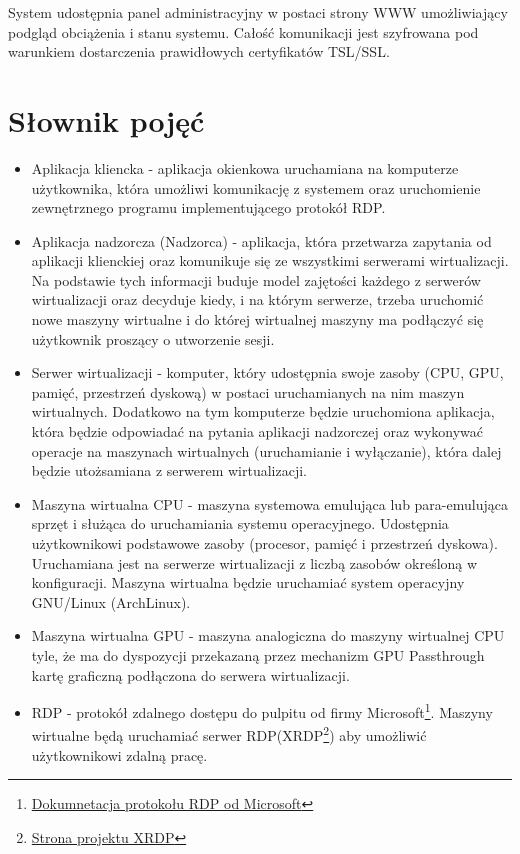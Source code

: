 \documentclass[12pt]{article}
\begin{document}
System udostępnia panel administracyjny w postaci strony WWW umożliwiający podgląd obciążenia i stanu systemu. Całość komunikacji jest szyfrowana pod warunkiem dostarczenia prawidłowych certyfikatów TSL/SSL.

\section{Słownik pojęć}
\begin{itemize}
	\item Aplikacja kliencka - aplikacja okienkowa uruchamiana na komputerze użytkownika, która umożliwi komunikację z systemem oraz uruchomienie zewnętrznego programu implementującego protokół RDP.
	\item Aplikacja nadzorcza (Nadzorca) - aplikacja, która przetwarza zapytania od aplikacji klienckiej oraz komunikuje się ze wszystkimi serwerami wirtualizacji. Na podstawie tych informacji buduje model zajętości każdego z serwerów wirtualizacji oraz decyduje kiedy, i na którym serwerze, trzeba uruchomić nowe maszyny wirtualne i do której wirtualnej maszyny ma podłączyć się użytkownik proszący o utworzenie sesji.
	\item Serwer wirtualizacji - komputer, który udostępnia swoje zasoby (CPU, GPU, pamięć, przestrzeń dyskową) w postaci uruchamianych na nim maszyn wirtualnych. Dodatkowo na tym komputerze będzie uruchomiona aplikacja, która będzie odpowiadać na pytania aplikacji nadzorczej oraz wykonywać operacje na maszynach wirtualnych (uruchamianie i wyłączanie), która dalej będzie utożsamiana z serwerem wirtualizacji.
	\item Maszyna wirtualna CPU - maszyna systemowa emulująca lub para-emulująca sprzęt i służąca do uruchamiania systemu operacyjnego. Udostępnia użytkownikowi podstawowe zasoby (procesor, pamięć i przestrzeń dyskowa). Uruchamiana jest na serwerze wirtualizacji z liczbą zasobów określoną w konfiguracji. Maszyna wirtualna będzie uruchamiać system operacyjny GNU/Linux (ArchLinux).
	\item Maszyna wirtualna GPU - maszyna analogiczna do maszyny wirtualnej CPU tyle, że ma do dyspozycji przekazaną przez mechanizm GPU Passthrough kartę graficzną podłączona do serwera wirtualizacji.
	\item RDP - protokół zdalnego dostępu do pulpitu od firmy Microsoft\footnote{\href{https://docs.microsoft.com/en-us/troubleshoot/windows-server/remote/understanding-remote-desktop-protocol}{Dokumnetacja protokołu RDP od Microsoft}}. Maszyny wirtualne będą uruchamiać serwer RDP(XRDP\footnote{\href{http://xrdp.org/}{Strona projektu XRDP}}) aby umożliwić użytkownikowi zdalną pracę.

\end{itemize}
\end{document}
